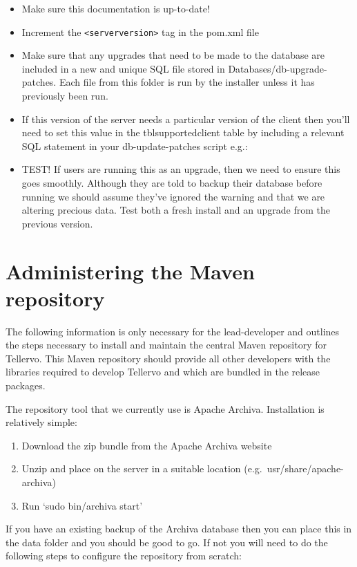 \begin{itemize}
 \item Make sure this documentation is up-to-date! 
 \item Increment the \verb|<serverversion>| tag in the pom.xml file
 \item Make sure that any upgrades that need to be made to the database are included in a new and unique SQL file stored in Databases/db-upgrade-patches.  Each file from this folder is run by the installer unless it has previously been run.  
 \item If this version of the server needs a particular version of the client then you'll need to set this value in the tblsupportedclient table by including a relevant SQL statement in your db-update-patches script e.g.: 
 \item TEST!  If users are running this as an upgrade, then we need to ensure this goes smoothly.  Although they are told to backup their database before running we should assume they've ignored the warning and that we are altering precious data. Test both a fresh install and an upgrade from the previous version.
\end{itemize}



\section{Administering the Maven repository}
The following information is only necessary for the lead-developer and outlines the steps necessary to install and maintain the central Maven repository for Tellervo.  This Maven repository should provide all other developers with the libraries required to develop Tellervo and which are bundled in the release packages.

The repository tool that we currently use is Apache Archiva.  Installation is relatively simple:

\begin{enumerate}
 \item Download the zip bundle from the Apache Archiva website
 \item Unzip and place on the server in a suitable location (e.g.\ usr/share/apache-archiva)
 \item Run `sudo bin/archiva start'
\end{enumerate}

If you have an existing backup of the Archiva database then you can place this in the data folder and you should be good to go.  If not you will need to do the following steps to configure the repository from scratch:

